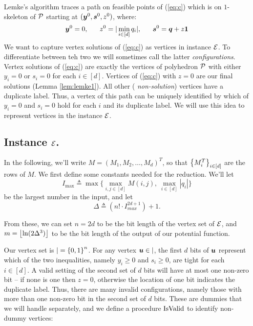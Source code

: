 Lemke's algorithm traces a path on feasible points of (\ref{eq:c}) which is on
$1$-skeleton of $\mbox{${\mathcal P}$}$ starting at $(\mbox{\boldmath $y$}^0,\mbox{\boldmath $s$}^0,z^0)$, where:
\begin{equation}\label{eq:v0}
\yy^0=0,\ \ \ \ \ z^0= |\min_{i \in [d]} q_i|,\ \ \ \ \  \ps^0=\qq+z\ones
\end{equation}
We want to capture
vertex solutions of (\ref{eq:c}) as vertices in \EOPL instance $\mbox{${\mathcal E}$}$. To
differentiate between teh two we will sometimes call the latter {\em configurations}. Vertex
solutions of (\ref{eq:c}) are exactly the vertices of polyhedron $\mbox{${\mathcal P}$}$ with
either $y_i=0$ or $s_i=0$ for each $i\in [d]$. Vertices of (\ref{eq:c}) with
$z=0$ are our final solutions (Lemma \ref{lem:lemke1}). All other ({\em
non-solution}) vertices have a duplicate label. Thus, a vertex of this path can be
uniquely identified by which of $y_i=0$ and $s_i=0$ hold for each $i$ and its
duplicate label. We will use this idea to represent vertices in the \EOPL
instance $\mbox{${\mathcal E}$}$. 

\subsection{\bf \EOPL Instance $\mbox{${\mathcal E}$}$.}

In the following, we'll write $M = (M_1, M_2, \dotsc, M_d)^T$, so that $\left\{ M^T_i \right\}_{i\in [d]}$ are the rows of $M$.
We first define some constants needed for the reduction. We'll let 
\[ I_{\max} \triangleq \max\{\max_{i,j\in [d]} M(i,j),\ \max_{i\in [d]} |q_i|\} \] be the largest number in the input, and let 
\[\Delta \triangleq (n! \cdot I_{max}^{2d+1})+1\text{.} \]

From these, we can set $n= 2d$ to be the bit length of the vertex set of $\mbox{${\mathcal E}$}$, and $m=\left\lfloor \ln(2\Delta^3) \right\rfloor$ to be the bit length of the output of our potential function.

Our vertex set is $\vert = \left\{ 0,1 \right\}^n$. For any vertex $\mbox{\boldmath $u$}\in \vert$, the first $d$ bits of $\mbox{\boldmath $u$}$ represent
which of the two inequalities, namely $y_i\ge 0$ and $s_i\ge 0$, are tight for
each $i \in [d]$. A valid setting of the second set of $d$ bits will have 
at most one non-zero bit -- if none is one then $z=0$, otherwise the location of one bit indicates the duplicate label. 
Thus, there are many invalid configurations, namely
those with more than one non-zero bit in the second set of $d$ bits. 
These are dummies that we will handle separately, and we define a procedure 
$\mbox{IsValid}$ to identify non-dummy vertices:

